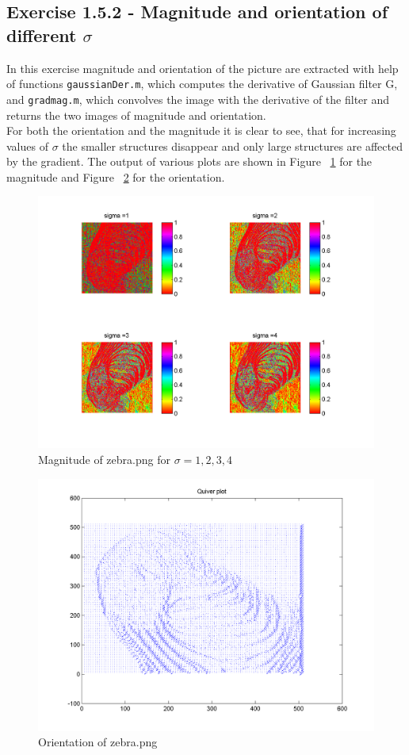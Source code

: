 \documentclass[11pt]{article}
\begin{document}
\subsection{Exercise 1.5.2 - Magnitude and orientation of different $\sigma$}
In this exercise magnitude and orientation of the picture are extracted with help of functions \texttt{gaussianDer.m}, which computes the derivative of Gaussian filter G, and \texttt{gradmag.m}, which convolves the image with the derivative of the filter and returns the two images of magnitude and orientation.\\
For both the orientation and the magnitude it is clear to see, that for increasing values of $\sigma$ the smaller structures disappear and only large structures are affected by the gradient. The output of various plots are shown in Figure ~\ref{magnitude} for the magnitude and Figure ~\ref{quiv} for the orientation.
\begin{figure}[h!]
\includegraphics[scale=0.6]{magnitude.png}
\caption{Magnitude of zebra.png for $\sigma = {1,2,3,4}$}
\label{magnitude}
\end{figure}

\begin{figure}[h!]
\includegraphics[scale=0.6]{quiv.png}
\caption{Orientation of zebra.png}
\label{quiv}
\end{figure}
\end{document}
